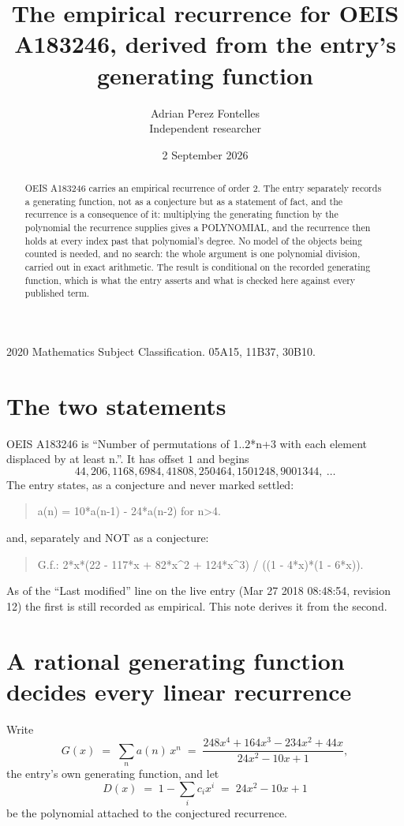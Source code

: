\documentclass[11pt,a4paper]{article}
\title{The empirical recurrence for OEIS A183246, derived from the entry's generating function}
\author{Adrian Perez Fontelles\\ \small Independent researcher}
\date{2 September 2026}
\theoremstyle{plain}
\theoremstyle{definition}
\begin{document}
\maketitle

\begin{abstract}
OEIS A183246 carries an empirical recurrence of order $2$. The entry separately records a
generating function, not as a conjecture but as a statement of fact, and the recurrence is a
consequence of it: multiplying the generating function by the polynomial the recurrence
supplies gives a POLYNOMIAL, and the recurrence then holds at every index past that
polynomial's degree. No model of the objects being counted is needed, and no search: the
whole argument is one polynomial division, carried out in exact arithmetic. The result is
conditional on the recorded generating function, which is what the entry asserts and what is
checked here against every published term.
\end{abstract}

\noindent\small 2020 Mathematics Subject Classification. 05A15, 11B37, 30B10.\normalsize

\section{The two statements}

OEIS A183246 is ``Number of permutations of 1..2*n+3 with each element displaced by at least n.''. It has offset $1$ and begins
\[
44, 206, 1168, 6984, 41808, 250464, 1501248, 9001344,\ \dots
\]
The entry states, as a conjecture and never marked settled:
\begin{quote}
a(n) = 10*a(n-1) - 24*a(n-2) for n>4.
\end{quote}
and, separately and NOT as a conjecture:
\begin{quote}
G.f.: 2*x*(22 - 117*x + 82*x\^{}2 + 124*x\^{}3) / ((1 - 4*x)*(1 - 6*x)).
\end{quote}
As of the ``Last modified'' line on the live entry (Mar 27 2018 08:48:54, revision 12) the first is still
recorded as empirical. This note derives it from the second.

\section{A rational generating function decides every linear recurrence}

Write
\[
G(x)\;=\;\sum_{n}a(n)\,x^{n}\;=\;\frac{248 x^{4} + 164 x^{3} - 234 x^{2} + 44 x}{24 x^{2} - 10 x + 1},
\]
the entry's own generating function, and let
\[
D(x)\;=\;1-\sum_i c_i x^{i}\;=\;24 x^{2} - 10 x + 1
\]
be the polynomial attached to the conjectured recurrence.
\end{document}
